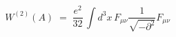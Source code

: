 \begin{equation}
W^{(2)}(A) \;=\; \frac{e^2}{32} \, \int d^3x \, F_{\mu\nu}
\frac{1}{\sqrt{-\partial^2}} F_{\mu\nu}
\end{equation}

